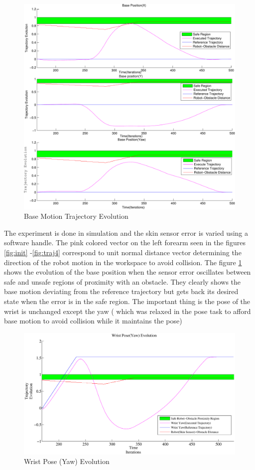     \begin{figure}[!h]
      \centering
      \includegraphics[scale=0.35]{doa/images/BasePlot-eps-converted-to-crop.pdf}
      \caption{Base Motion Trajectory Evolution}
      \label{figurebase}
   \end{figure}  
   
  The experiment is done in simulation and the skin sensor error is varied using a software handle. The pink colored vector on the left forearm seen in the figures \ref{fig:init} -\ref{fig:traj4} correspond to unit normal distance vector determining the direction of the robot motion in the workspace to avoid collision. The figure \ref{figurebase} shows the evolution of the base position when the sensor error oscillates between safe and unsafe regions of proximity with an obstacle. They clearly shows the base motion deviating from the reference trajectory but gets back its desired state when the error is in the safe region. The important thing is the pose of the wrist is unchanged except the yaw ( which was relaxed in the pose task to afford base motion to avoid collision while it maintains the pose)
   \begin{figure}[!h]
      \centering
      \includegraphics[scale=0.2]{doa/images/WristYawTrajectoryEvolution.eps}
      \caption{Wrist Pose (Yaw) Evolution}
      \label{poseYaw}
   \end{figure}
  
